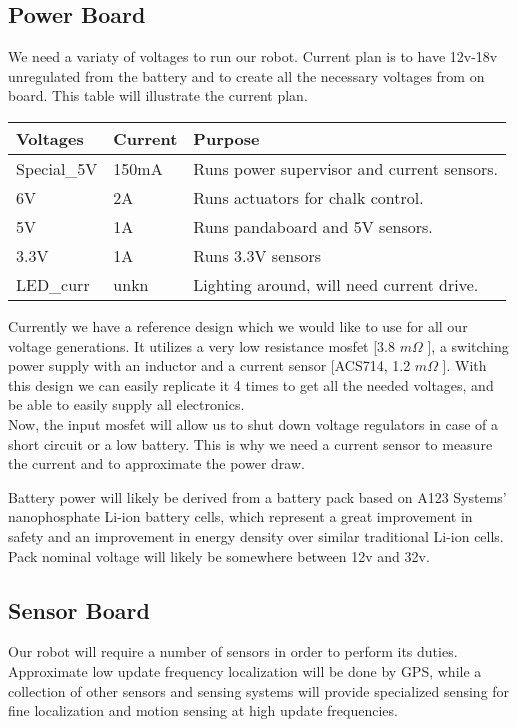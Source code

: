 \documentclass{article}
\begin{document}
\subsection{Power Board}
We need a variaty of voltages to run our robot. Current plan is to have 12v-18v unregulated from the battery and to create all the necessary voltages from on board. This table will illustrate the current plan.
\begin{center}
\begin{tabular}{|l|l|l|}
\hline
Voltages & Current & Purpose\\  \hline
Special\_5V & 150mA & Runs power supervisor and current sensors.\\ \hline
6V & 2A & Runs actuators for chalk control. \\ \hline 
5V & 1A & Runs pandaboard and 5V sensors. \\ \hline 
3.3V & 1A & Runs 3.3V sensors\\ \hline 
LED\_curr & unkn & Lighting around, will need current drive.\\ 
\hline
\end{tabular}
\end{center}
Currently we have a reference design which we would like to use for all our voltage generations. It utilizes a very low resistance mosfet [3.8 $m\Omega$ ], a switching power supply with an inductor and a current sensor [ACS714, 1.2 $m\Omega$ ].  With this design we can easily replicate it 4 times to get all the needed voltages, and be able to easily supply all electronics. \\
Now, the input mosfet will allow us to shut down voltage regulators in case of a short circuit or a low battery. This is why we need a current sensor to measure the current and to approximate the power draw.

Battery power will likely be derived from a battery pack based on A123 Systems' nanophosphate Li-ion battery cells, which represent a great improvement in safety and an improvement in energy density over similar traditional Li-ion cells. Pack nominal voltage will likely be somewhere between 12v and 32v.

\subsection{Sensor Board}
Our robot will require a number of sensors in order to perform its duties. Approximate low update frequency localization will be done by GPS, while a collection of other sensors and sensing systems will provide specialized sensing for fine localization and motion sensing at high update frequencies. 
\end{document}
